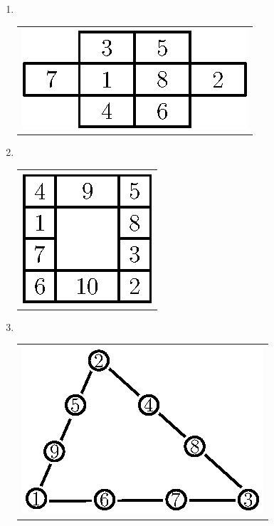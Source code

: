 \begin{enumerate}
\item 
~

  \vskip -0.4cm
  
\begin{tabular}[t]{c}
\centering
\includegraphics{src/figures/ans12.eps}
\end{tabular}

\smallskip

\item 
~

  \vskip -0.5cm
  
\begin{tabular}[t]{c}
\centering
\includegraphics{src/figures/ans13.eps}
\end{tabular}

\item 
~

  \vskip -0.4cm
  
\begin{tabular}[t]{c}
\centering
\includegraphics{src/figures/ans14.eps}
\end{tabular}


\end{enumerate}
